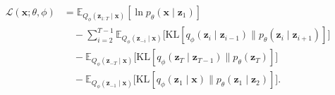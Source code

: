 \begin{equation}
\begin{aligned}
\mathcal{L}(\mathbf{x};\theta,\phi)
 &=\mathbb{E}_{Q_\phi(\mathbf{z}_{1:T}\mid\mathbf{x})}[\ln p_\theta(\mathbf{x}\mid\mathbf{z}_1)]\\
 &\quad-\sum_{i=2}^{T-1}\mathbb{E}_{Q_\phi(\mathbf{z}_{-i}\mid\mathbf{x})}
       \bigl[\mathrm{KL}[q_\phi(\mathbf{z}_i\mid\mathbf{z}_{i-1})\|p_\theta(\mathbf{z}_i\mid\mathbf{z}_{i+1})]\bigr]\\
 &\quad-\mathbb{E}_{Q_\phi(\mathbf{z}_{-T}\mid\mathbf{x})}
       \bigl[\mathrm{KL}[q_\phi(\mathbf{z}_T\mid\mathbf{z}_{T-1})\|p_\theta(\mathbf{z}_T)]\bigr]\\
 &\quad-\mathbb{E}_{Q_\phi(\mathbf{z}_{-1}\mid\mathbf{x})}
       \bigl[\mathrm{KL}[q_\phi(\mathbf{z}_1\mid\mathbf{x})\|p_\theta(\mathbf{z}_1\mid\mathbf{z}_2)]\bigr].
\end{aligned}
\tag{5.92}\label{eq:05-92}
\end{equation}

